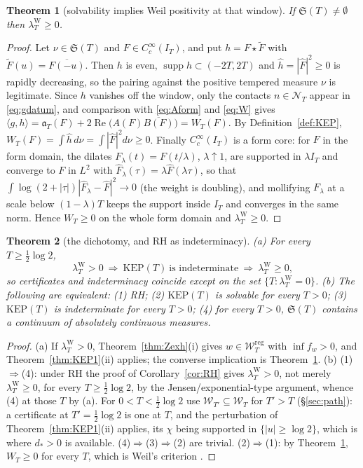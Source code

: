 \documentclass[11pt]{amsart}
\newtheorem{theorem}{Theorem}[section]
\theoremstyle{definition}
\theoremstyle{remark}
\newcommand{\Rel}{\operatorname{Re}}
\newcommand{\supp}{\operatorname{supp}}
\newcommand{\IT}{I_T}
\newcommand{\lamW}{\lambda^{\mathrm W}_T}
\newcommand{\Fh}{\widehat F}
\newcommand{\Wcl}{\mathcal W_T}
\newcommand{\NT}{\mathcal N_T}
\begin{document}
\begin{theorem}[solvability implies Weil positivity at that window]\label{thm:KEP2}
If $\mathfrak S(T)\ne\emptyset$ then $\lamW\ge0$.
\end{theorem}
\begin{proof}
Let $\nu\in\mathfrak S(T)$ and $F\in C_c^\infty(\IT)$, and put $h=F\star\widetilde F$ with
$\widetilde F(u)=\overline{F(-u)}$. Then $h$ is even, $\supp h\subset(-2T,2T)$ and
$\widehat h=|\Fh|^2\ge0$ is rapidly decreasing, so the pairing against the positive tempered measure
$\nu$ is legitimate. Since $h$ vanishes off the window, only the contacts $n\in\NT$ appear in
\eqref{eq:gdatum}, and comparison with \eqref{eq:Aform} and \eqref{eq:W} gives
$\langle g,h\rangle=\mathfrak a_T(F)+2\Rel\big(A(F)\overline{B(F)}\big)=W_T(F)$. By
Definition~\ref{def:KEP}, $W_T(F)=\int\widehat h\,d\nu=\int|\Fh|^2d\nu\ge0$. Finally
$C_c^\infty(\IT)$ is a form core: for $F$ in the form domain, the dilates $F_\lambda(t)=F(t/\lambda)$,
$\lambda\uparrow1$, are supported in $\lambda\IT$ and converge to $F$ in $L^2$ with
$\Fh_\lambda(\tau)=\lambda\Fh(\lambda\tau)$, so that
$\int\log(2+|\tau|)|\Fh_\lambda-\Fh|^2\to0$ (the weight is doubling), and mollifying $F_\lambda$ at a
scale below $(1-\lambda)T$ keeps the support inside $\IT$ and converges in the same norm. Hence
$W_T\ge0$ on the whole form domain and $\lamW\ge0$.
\end{proof}

\begin{theorem}[the dichotomy, and RH as indeterminacy]\label{thm:KEP3}
\emph{(a)} For every $T\ge\frac12\log2$,
\[
\lamW>0\ \Longrightarrow\ \mathrm{KEP}(T)\ \text{is indeterminate}\ \Longrightarrow\ \lamW\ge0 ,
\]
so certificates and indeterminacy coincide except on the set $\{T:\lamW=0\}$.
\emph{(b)} The following are equivalent: \emph{(1)} RH; \emph{(2)} $\mathrm{KEP}(T)$ is solvable for
every $T>0$; \emph{(3)} $\mathrm{KEP}(T)$ is indeterminate for every $T>0$; \emph{(4)} for every
$T>0$, $\mathfrak S(T)$ contains a continuum of absolutely continuous measures.
\end{theorem}
\begin{proof}
(a) If $\lamW>0$, Theorem~\ref{thm:Zexh}(i) gives $w\in\Wcl^{\mathrm{reg}}$ with $\inf f_w>0$, and
Theorem~\ref{thm:KEP1}(ii) applies; the converse implication is Theorem~\ref{thm:KEP2}.
(b) (1)$\Rightarrow$(4): under RH the proof of Corollary~\ref{cor:RH} gives $\lamW>0$, not merely
$\lamW\ge0$, for every $T\ge\frac12\log2$, by the Jensen/exponential-type argument, whence (4) at
those $T$ by (a). For $0<T<\frac12\log2$ use $\mathcal W_{T'}\subseteq\Wcl$ for $T'>T$
(\S\ref{sec:path}): a certificate at $T'=\frac12\log2$ is one at $T$, and the perturbation of
Theorem~\ref{thm:KEP1}(ii) applies, its $\chi$ being supported in $\{|u|\ge\log2\}$, which is where
$d_*>0$ is available. (4)$\Rightarrow$(3)$\Rightarrow$(2) are trivial. (2)$\Rightarrow$(1): by
Theorem~\ref{thm:KEP2}, $W_T\ge0$ for every $T$, which is Weil's criterion
\cite{Weil52,Bombieri2000}.
\end{proof}
\end{document}
